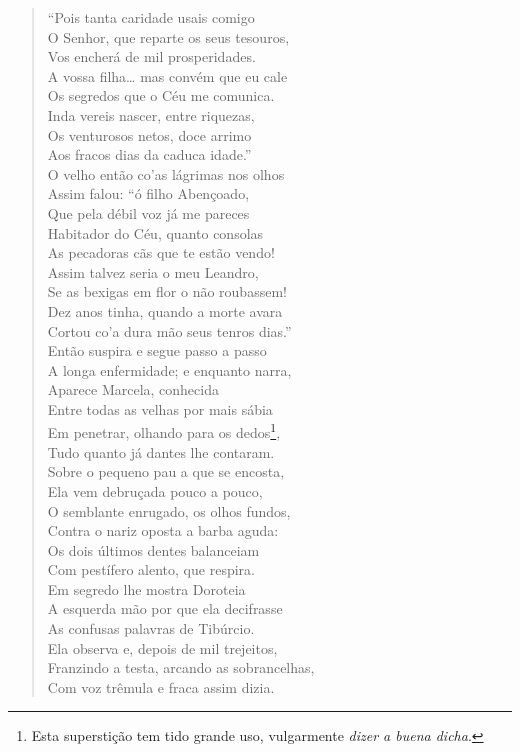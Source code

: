\begin{verse}
``Pois tanta caridade usais comigo\\
O Senhor, que reparte os seus tesouros,\\ 
Vos encherá de mil prosperidades.\\
A vossa filha\ldots{} mas convém que eu cale\\
Os segredos que o Céu me comunica.\\
Inda vereis nascer, entre riquezas,\\
Os venturosos netos, doce arrimo\\
Aos fracos dias da caduca idade.''\\
O velho então co'as lágrimas nos olhos\\
Assim falou: ``ó filho Abençoado,\\
Que pela débil voz já me pareces\\
Habitador do Céu, quanto consolas\\
As pecadoras cãs que te estão vendo!\\
Assim talvez seria o meu Leandro,\\
Se as bexigas em flor o não roubassem!\\	\index{\Bexig}
Dez anos tinha, quando a morte avara\\
Cortou co'a dura mão seus tenros dias.''\\
Então suspira e segue passo a passo\\
A longa enfermidade; e enquanto narra,\\
Aparece Marcela, conhecida\\
Entre todas as velhas por mais sábia\\
Em penetrar, olhando para os dedos\footnote{ Esta superstição tem tido
grande uso, vulgarmente \textit{dizer a buena dicha}.},\\
Tudo quanto já dantes lhe contaram.\\
Sobre o pequeno pau a que se encosta,\\
Ela vem debruçada pouco a pouco,\\
O semblante enrugado, os olhos fundos,\\
Contra o nariz oposta a barba aguda:\\
Os dois últimos dentes balanceiam\\
Com pestífero alento, que respira.\\
Em segredo lhe mostra Doroteia\\
A esquerda mão por que ela decifrasse\\
As confusas palavras de Tibúrcio.\\
Ela observa e, depois de mil trejeitos,\\
Franzindo a testa, arcando as sobrancelhas,\\
Com voz trêmula e fraca assim dizia. \\[10pt]



\end{verse}
